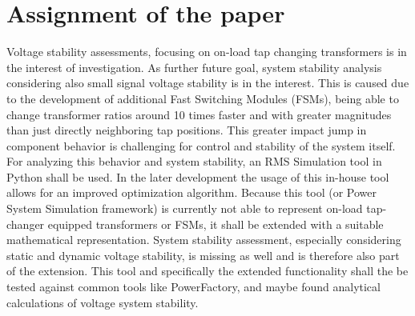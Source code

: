 
\chapter*{Assignment of the paper}
\thispagestyle{plain.scrheadings}

Voltage stability assessments, focusing on on-load tap changing transformers is in the interest of investigation. As further future goal, system stability analysis considering also small signal voltage stability is in the interest. This is caused due to the development of additional Fast Switching Modules (FSMs), being able to change transformer ratios around 10 times faster and with greater magnitudes than just directly neighboring tap positions. This greater impact jump in component behavior is challenging for control and stability of the system itself. For analyzing this behavior and system stability, an RMS Simulation tool in Python shall be used. In the later development the usage of this in-house tool allows for an improved optimization algorithm. Because this tool (or Power System Simulation framework) is currently not able to represent on-load tap-changer equipped transformers or FSMs, it shall be extended with a suitable mathematical representation. System stability assessment, especially considering static and dynamic voltage stability, is missing as well and is therefore also part of the extension. This tool and specifically the extended functionality shall the be tested against common tools like PowerFactory, and maybe found analytical calculations of voltage system stability.


